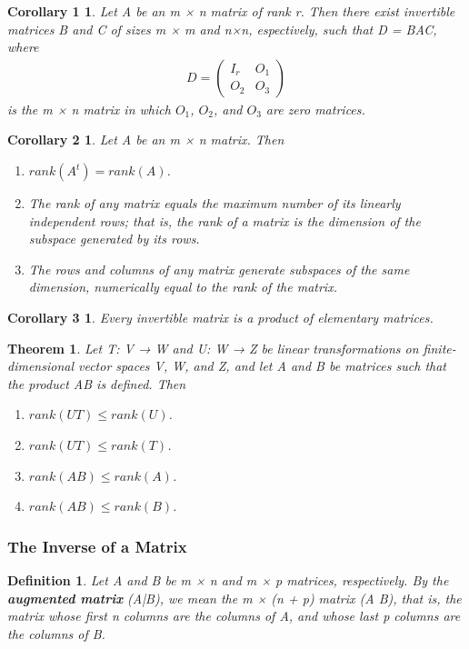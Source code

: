 \documentclass{article}
\newcommand{\bd}[1]{\textbf{#1}}
\newcommand*\bpmat[0]{\begin{pmatrix}}
\newcommand*\epmat[0]{\end{pmatrix}}
\theoremstyle{plain}
\newtheorem{theorem}{Theorem}[section]
\newtheorem*{corollary1}{Corollary 1}
\newtheorem*{corollary2}{Corollary 2}
\newtheorem*{corollary3}{Corollary 3}
\newtheorem*{definition1}{Definition}
\theoremstyle{plain} %
\begin{document}
\begin{corollary1}
  Let A be an m × n matrix of rank r. Then there exist invertible matrices B and C of sizes m × m and n×n,  espectively, such that D = BAC, where
	\begin{align*}
    D=\bpmat I_r&O_1\\O_2&O_3\epmat
  \end{align*}
is the m × n matrix in which $O_1$, $O_2$, and $O_3$ are zero matrices.
\end{corollary1}

\begin{corollary2}
  Let A be an m × n matrix. Then
  \begin{enumerate}[label=(\alph*)]
    \item $rank(A^t) = rank(A)$.
    \item The rank of any matrix equals the maximum number of its linearly independent rows; that is, the rank of a matrix is the dimension of the subspace generated by its rows.
    \item The rows and columns of any matrix generate subspaces of the same dimension, numerically equal to the rank of the matrix.
  \end{enumerate}
\end{corollary2}

\begin{corollary3}
  Every invertible matrix is a product of elementary matrices.
\end{corollary3}

\begin{theorem}
  Let T: V → W and U: W → Z be linear transformations on finite-dimensional vector spaces V, W, and Z, and let A and B be matrices such that the product AB is defined. Then
  \begin{enumerate}[label=(\alph*)]
    \item $rank(UT) \leq rank(U)$.
    \item $rank(UT) \leq rank(T)$.
    \item $rank(AB) \leq rank(A)$.
    \item $rank(AB) \leq rank(B)$.
  \end{enumerate}
\end{theorem}

\subsubsection*{The Inverse of a Matrix}

\begin{definition1}
  Let A and B be m × n and m × p matrices, respectively. By the \bd{augmented matrix} (A|B), we mean the m × (n + p) matrix (A B), that is, the matrix whose first n columns are the columns of A, and whose last p columns are the columns of B.
\end{definition1}
\end{document}
